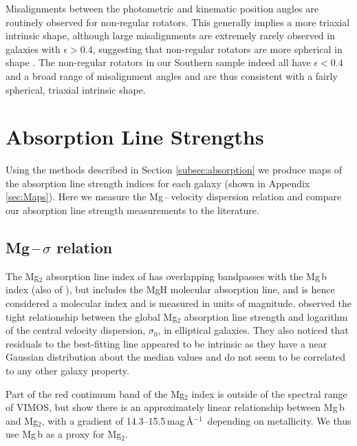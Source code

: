 \documentclass[a4paper,fleqn,usenatbib]{mnras}
\begin{document}
		Misalignments between the photometric and kinematic position angles are routinely observed for non-regular rotators. This generally implies a more triaxial intrinsic shape, although large misalignments are extremely rarely observed in galaxies with $\epsilon > 0.4$, suggesting that non-regular rotators are more spherical in shape \citep{Cappellari2016}. The non-regular rotators in our Southern sample indeed all have $\epsilon < 0.4$ and a broad range of misalignment angles and are thus consistent with a fairly spherical, triaxial intrinsic shape.

\section{Absorption Line Strengths}
	\label{sec:absorption}
	Using the methods described in Section \ref{subsec:absorption} we produce maps of the absorption line strength indices for each galaxy (shown in Appendix \ref{sec:Maps}). Here we measure the Mg\,--\,velocity dispersion relation and compare our absorption line strength measurements to the literature. 

	\subsection{Mg\,--\,$\sigma$ relation}
		\label{subsec:Mgsigma}
		The Mg$_2$ absorption line index of \citet{Trager1998} has overlapping bandpasses with the Mg\,b index (also of \citeauthor{Trager1998}), but includes the MgH molecular absorption line, and is hence considered a molecular index and is measured in units of magnitude. \citet{Bender1993} observed the tight relationship between the global Mg$_2$ absorption line strength and logarithm of the central velocity dispersion, $\sigma_0$, in elliptical galaxies. They also noticed that residuals to the best-fitting line appeared to be intrinsic as they have a near Gaussian distribution about the median values and do not seem to be correlated to any other galaxy property. 

		Part of the red continuum band of the Mg$_2$ index is outside of the spectral range of VIMOS, but \citet{Ziegler1997} show there is an approximately linear relationship between Mg\,b and Mg$_2$, with a gradient of 14.3--15.5\,mag\,\AA$^{-1}$\ depending on metallicity. We thus use Mg\,b as a proxy for Mg$_2$. 
\end{document}
